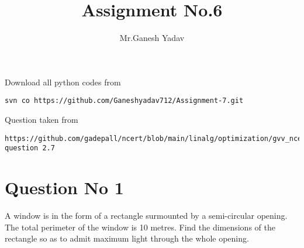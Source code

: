 \documentclass[journal,12pt,twocolumn]{IEEEtran}
\begin{document}
\def\rightbox#1{\makebox[0in][r]{#1}}
\def\centbox#1{\makebox[0in]{#1}}
\def\topbox#1{\raisebox{-\baselineskip}[0in][0in]{#1}}
\def\midbox#1{\raisebox{-0.5\baselineskip}[0in][0in]{#1}}
\vspace{3cm}
\title{Assignment No.6}
\author{Mr.Ganesh Yadav}
\maketitle
\newpage
\bigskip
\renewcommand{\thefigure}{\theenumi}
\renewcommand{\thetable}{\theenumi}
Download all python codes from
\begin{lstlisting}
svn co https://github.com/Ganeshyadav712/Assignment-7.git
\end{lstlisting}
%
Question taken from
\begin{lstlisting}
https://github.com/gadepall/ncert/blob/main/linalg/optimization/gvv_ncert_opt.pdf question 2.7
\end{lstlisting}
\section{Question No 1}
A window is in the form of a rectangle surmounted by a semi-circular opening. The total perimeter of the window is 10 metres. Find the dimensions of the rectangle so as to admit maximum light through the whole opening.
\end{document}
